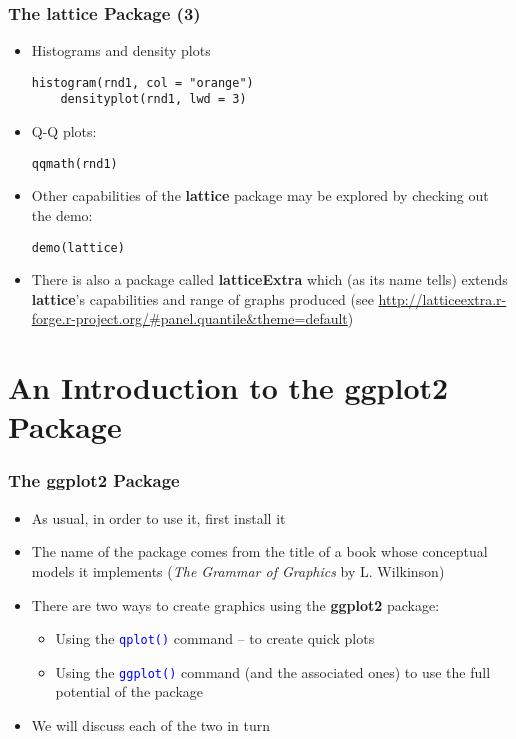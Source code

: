 \documentclass[10pt]{beamer}
\newcommand{\cc}[1]{\texttt{\textcolor{blue}{#1}}}
\theoremstyle{definition}
\begin{document}
\begin{frame}[fragile]
\frametitle{The \textbf{lattice} Package (3)}
\begin{itemize}
	\item Histograms and density plots
	\begin{lstlisting}[style = rstyle, breaklines]
	histogram(rnd1, col = "orange")
	densityplot(rnd1, lwd = 3)
	\end{lstlisting}
	\item Q-Q plots:
	\begin{lstlisting}[style = rstyle, breaklines]
	qqmath(rnd1)
	\end{lstlisting}
	\item Other capabilities of the \textbf{lattice} package may be explored by checking out the demo:
	\begin{lstlisting}[style = rstyle, breaklines]
	demo(lattice)
	\end{lstlisting}
	\item There is also a package called \textbf{latticeExtra} which (as its name tells) extends \textbf{lattice}'s capabilities and range of graphs produced (see \url{http://latticeextra.r-forge.r-project.org/#panel.quantile&theme=default})
\end{itemize}
\end{frame}

\section{An Introduction to the ggplot2 Package}
\begin{frame}[fragile]
\frametitle{The \textbf{ggplot2} Package}
\begin{itemize}
	\item As usual, in order to use it, first install it
	\item The name of the package comes from the title of a book whose conceptual models it implements (\emph{The Grammar of Graphics} by L. Wilkinson)
	\item There are two ways to create graphics using the \textbf{ggplot2} package:
	\begin{itemize}
		\item Using the \cc{qplot()} command -- to create quick plots
		\item Using the \cc{ggplot()} command (and the associated ones) to use the full potential of the package
	\end{itemize}
	\item We will discuss each of the two in turn
\end{itemize}
\end{frame}
\end{document}
